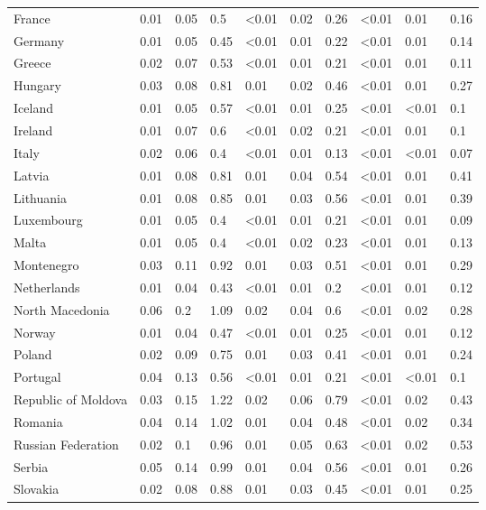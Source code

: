 \begin{longtable}[t]{llllllllll}
France & 0.01 & 0.05 & 0.5 & <0.01 & 0.02 & 0.26 & <0.01 & 0.01 & 0.16\\
Germany & 0.01 & 0.05 & 0.45 & <0.01 & 0.01 & 0.22 & <0.01 & 0.01 & 0.14\\
Greece & 0.02 & 0.07 & 0.53 & <0.01 & 0.01 & 0.21 & <0.01 & 0.01 & 0.11\\
\addlinespace
Hungary & 0.03 & 0.08 & 0.81 & 0.01 & 0.02 & 0.46 & <0.01 & 0.01 & 0.27\\
Iceland & 0.01 & 0.05 & 0.57 & <0.01 & 0.01 & 0.25 & <0.01 & <0.01 & 0.1\\
Ireland & 0.01 & 0.07 & 0.6 & <0.01 & 0.02 & 0.21 & <0.01 & 0.01 & 0.1\\
Italy & 0.02 & 0.06 & 0.4 & <0.01 & 0.01 & 0.13 & <0.01 & <0.01 & 0.07\\
Latvia & 0.01 & 0.08 & 0.81 & 0.01 & 0.04 & 0.54 & <0.01 & 0.01 & 0.41\\
\addlinespace
Lithuania & 0.01 & 0.08 & 0.85 & 0.01 & 0.03 & 0.56 & <0.01 & 0.01 & 0.39\\
Luxembourg & 0.01 & 0.05 & 0.4 & <0.01 & 0.01 & 0.21 & <0.01 & 0.01 & 0.09\\
Malta & 0.01 & 0.05 & 0.4 & <0.01 & 0.02 & 0.23 & <0.01 & 0.01 & 0.13\\
Montenegro & 0.03 & 0.11 & 0.92 & 0.01 & 0.03 & 0.51 & <0.01 & 0.01 & 0.29\\
Netherlands & 0.01 & 0.04 & 0.43 & <0.01 & 0.01 & 0.2 & <0.01 & 0.01 & 0.12\\
\addlinespace
North Macedonia & 0.06 & 0.2 & 1.09 & 0.02 & 0.04 & 0.6 & <0.01 & 0.02 & 0.28\\
Norway & 0.01 & 0.04 & 0.47 & <0.01 & 0.01 & 0.25 & <0.01 & 0.01 & 0.12\\
Poland & 0.02 & 0.09 & 0.75 & 0.01 & 0.03 & 0.41 & <0.01 & 0.01 & 0.24\\
Portugal & 0.04 & 0.13 & 0.56 & <0.01 & 0.01 & 0.21 & <0.01 & <0.01 & 0.1\\
Republic of Moldova & 0.03 & 0.15 & 1.22 & 0.02 & 0.06 & 0.79 & <0.01 & 0.02 & 0.43\\
\addlinespace
Romania & 0.04 & 0.14 & 1.02 & 0.01 & 0.04 & 0.48 & <0.01 & 0.02 & 0.34\\
Russian Federation & 0.02 & 0.1 & 0.96 & 0.01 & 0.05 & 0.63 & <0.01 & 0.02 & 0.53\\
Serbia & 0.05 & 0.14 & 0.99 & 0.01 & 0.04 & 0.56 & <0.01 & 0.01 & 0.26\\
Slovakia & 0.02 & 0.08 & 0.88 & 0.01 & 0.03 & 0.45 & <0.01 & 0.01 & 0.25\\

\end{longtable}
